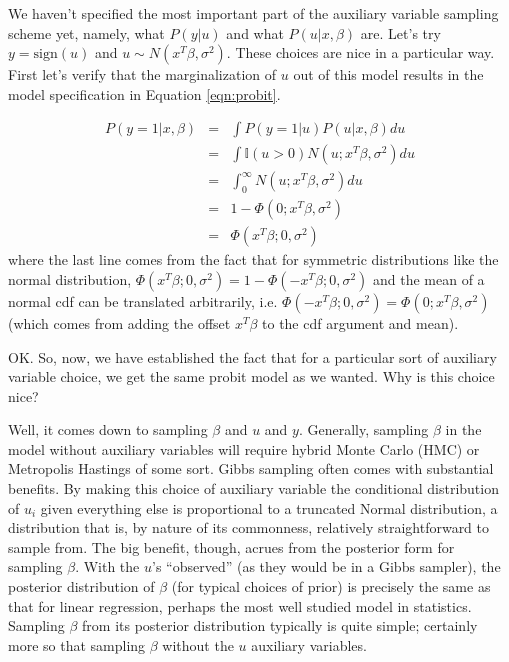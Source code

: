 \documentclass[11pt]{amsart}
\begin{document}
We haven't specified the most important part of the auxiliary variable sampling scheme yet, namely, what $P(y|u)$ and what $P(u|x,\beta)$ are.   Let's try $y = \mbox{sign}(u)$ and $u \sim N(x^T\beta,\sigma^2).$  These choices are nice in a particular way.  First let's verify that the marginalization of $u$ out of this model results in the model specification in Equation \ref{eqn:probit}.

\begin{eqnarray*}
P(y=1|x,\beta) &=&  \int P(y=1|u)P(u|x,\beta)du\\
&=& \int \mathbb{I}(u>0)N(u;x^T\beta,\sigma^2) du \\
&=& \int_0^\infty N(u;x^T\beta,\sigma^2) du \\
&=& 1 - \Phi(0; x^T\beta,\sigma^2) \\ 
&=& \Phi(x^T\beta; 0, \sigma^2)
\end{eqnarray*}
where the last line comes from the fact that for symmetric distributions like the normal distribution, 
$\Phi(x^T\beta; 0, \sigma^2) = 1 - \Phi(-x^T\beta; 0, \sigma^2)$ and the mean of a normal cdf can be translated arbitrarily, i.e. $\Phi(-x^T\beta; 0, \sigma^2) = \Phi(0;x^T\beta, \sigma^2)$ (which comes from adding the offset $x^T\beta$ to the cdf argument and mean).  

OK.  So, now, we have established the fact that for a particular sort of auxiliary variable choice, we get the same probit model as we wanted.  Why is this choice nice?

Well, it comes down to sampling $\beta$ and $u$ and $y$.  Generally, sampling $\beta$ in the model without auxiliary variables will require hybrid Monte Carlo (HMC) or Metropolis Hastings of some sort.  Gibbs sampling often comes with substantial benefits.  By making this choice of auxiliary variable the conditional distribution of $u_i$ given everything else is proportional to a truncated Normal distribution, a distribution that is, by nature of its commonness, relatively straightforward to sample from.  The big benefit, though, acrues from the posterior form for sampling $\beta$.  With the $u$'s ``observed'' (as they would be in a Gibbs sampler), the posterior distribution of $\beta$ (for typical choices of prior) is precisely the same as that for linear regression, perhaps the most well studied model in statistics.  Sampling $\beta$ from its posterior distribution typically is quite simple; certainly more so that sampling $\beta$ without the $u$ auxiliary variables.
\end{document}
